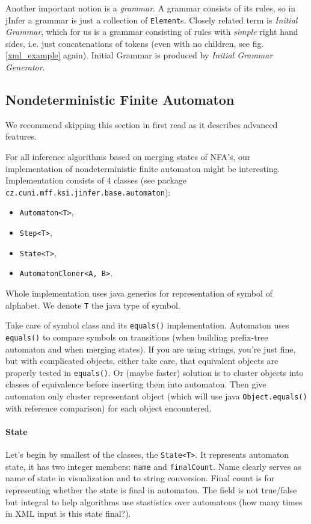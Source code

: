 \documentclass[a4paper,10pt,oneside]{article}
\newcommand{\code}[1]{\texttt{#1}}
\newcommand{\jmodule}[1]{\emph{#1}}
\begin{document}
Another important notion is a \emph{grammar}. A grammar consists of its rules, so in jInfer a grammar is just a collection of \code{Element}s. Closely related term is \emph{Initial Grammar}, which for us is a grammar consisting of rules with \emph{simple} right hand sides, i.e. just concatenations of tokens (even with no children, see fig. \ref{xml_example} again). Initial Grammar is produced by \jmodule{Initial Grammar Generator}.

\subsection{Nondeterministic Finite Automaton}
We recommend skipping this section in first read as it describes advanced features.

For all inference algorithms based on merging states of NFA's, our implementation of nondeterministic finite automaton might be interesting.
Implementation consists of 4 classes (see package \code{cz.cuni.mff.ksi.jinfer.base.automaton}): 
\begin{itemize}
  \item \code{Automaton<T>},
  \item \code{Step<T>},
  \item \code{State<T>},
  \item \code{AutomatonCloner<A, B>}.
\end{itemize}
Whole implementation uses java generics for representation of symbol of alphabet.
We denote \code{T} the java type of symbol.

Take care of symbol class and its \code{equals()} implementation.
Automaton uses \code{equals()} to compare symbols on transitions (when building prefix-tree automaton and when merging states).
If you are using strings, you're just fine, but with complicated objects, either take care, that equivalent objects are properly tested in \code{equals()}.
Or (maybe faster) solution is to cluster objects into classes of equivalence before inserting them into automaton.
Then give automaton only cluster representant object (which will use java \code{Object.equals()} with reference comparison) for each object encountered.

\paragraph{State}
Let's begin by smallest of the classes, the \code{State<T>}.
It represents automaton state, it has two integer members: \code{name} and \code{finalCount}.
Name clearly serves as name of state in visualization and to string conversion.
Final count is for representing whether the state is final in automaton.
The field is not true/false but integral to help algorithms use stastistics over automatons (how many times in XML input is this state final?).
\end{document}
